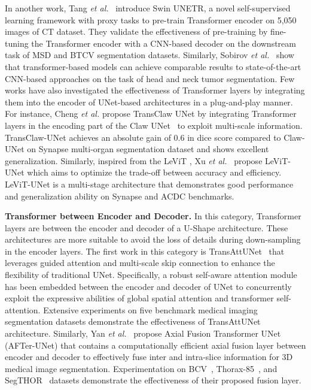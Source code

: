 \documentclass[10pt,journal,compsoc]{IEEEtran}
\begin{document}
In another work, Tang \textit{et al.}~\cite{tang2021self} introduce Swin UNETR, a novel self-supervised learning framework with proxy tasks to pre-train Transformer encoder on 5,050 images of CT dataset. They validate the effectiveness of pre-training by fine-tuning the Transformer encoder with a CNN-based decoder on the downstream task of MSD and BTCV segmentation datasets.
Similarly, Sobirov \textit{et al.}~\cite{sobirov2022automatic} show that transformer-based models can achieve comparable results to state-of-the-art CNN-based approaches on the task of head and neck tumor segmentation. 
Few works have also investigated the effectiveness of Transformer layers by integrating them into the encoder of UNet-based architectures in a plug-and-play manner. For instance, Cheng \textit{et al.} \cite{chang2021transclaw} propose TransClaw UNet by integrating Transformer layers in the encoding part of the Claw UNet~\cite{yao2020claw} to exploit multi-scale information.
TransClaw-UNet achieves an absolute gain of 0.6 in dice score compared to Claw-UNet on Synapse multi-organ segmentation dataset and shows excellent generalization.
Similarly, inspired from the LeViT \cite{graham2021levit}, Xu \textit{et al.}~\cite{xu2021levit} propose LeViT-UNet which aims to optimize the trade-off between accuracy and efficiency. %
LeViT-UNet is a multi-stage architecture 
that demonstrates good performance and generalization ability on Synapse and ACDC %
benchmarks.


{{\textbf{Transformer between Encoder and Decoder.}}} In this category, Transformer layers are between the encoder and decoder of a U-Shape architecture. These architectures are more suitable to avoid the loss of details during down-sampling in the encoder layers. The first work in this category is TransAttUNet~\cite{chen2021transattunet}
that leverages guided attention and multi-scale skip connection to enhance the flexibility of traditional UNet. Specifically, a robust self-aware attention module has been embedded between the encoder and decoder of UNet to concurrently exploit the expressive abilities of global spatial attention and transformer self-attention. Extensive experiments on five benchmark medical imaging segmentation datasets demonstrate the effectiveness of TransAttUNet architecture. Similarly, Yan \textit{et al.}~\cite{yan2021after} propose Axial Fusion Transformer UNet (AFTer-UNet) that contains a computationally efficient axial fusion layer between encoder and decoder to effectively fuse inter and intra-slice %
information for 3D medical image segmentation. Experimentation on BCV~\cite{simpson2019large}, Thorax-85~\cite{chen2021deep}, and SegTHOR~\cite{lambert2020segthor} datasets demonstrate the effectiveness of their proposed fusion layer.
\end{document}

